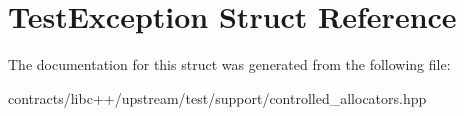 \hypertarget{struct_test_exception}{}\section{Test\+Exception Struct Reference}
\label{struct_test_exception}


The documentation for this struct was generated from the following file\+:\begin{DoxyCompactItemize}
\item 
contracts/libc++/upstream/test/support/controlled\+\_\+allocators.\+hpp\end{DoxyCompactItemize}
